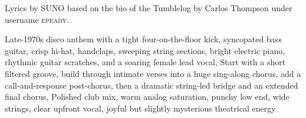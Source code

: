 
\begin{notes}
Lyrics by SUNO based on the bio of the Tumblelog by Carlos Thompson under username \textsc{epeady}.
\end{notes}
\begin{style}
Late-1970s disco anthem with a tight four-on-the-floor kick, syncopated bass guitar, crisp hi-hat, handclaps, sweeping string sections, bright electric piano, rhythmic guitar scratches, and a soaring female lead vocal, Start with a short filtered groove, build through intimate verses into a huge sing-along chorus, add a call-and-response post-chorus, then a dramatic string-led bridge and an extended final chorus, Polished club mix, warm analog saturation, punchy low end, wide strings, clear upfront vocal, joyful but slightly mysterious theatrical energy
\end{style}

